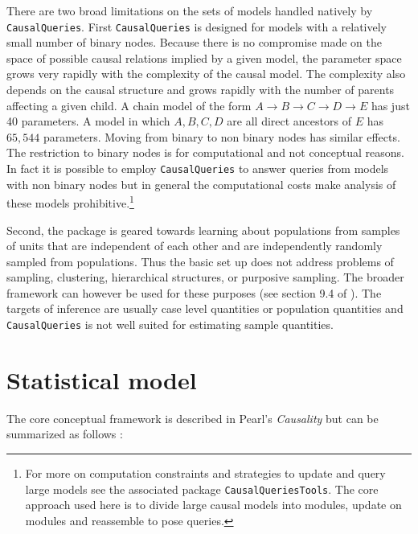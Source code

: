 \documentclass[
  11pt,
  article]{jss}
\begin{document}
There are two broad limitations on the sets of models handled natively
by \texttt{CausalQueries}. First \texttt{CausalQueries} is designed for
models with a relatively small number of binary nodes. Because there is
no compromise made on the space of possible causal relations implied by
a given model, the parameter space grows very rapidly with the
complexity of the causal model. The complexity also depends on the
causal structure and grows rapidly with the number of parents affecting
a given child. A chain model of the form
\(A \rightarrow B \rightarrow C \rightarrow D \rightarrow E\) has just
40 parameters. A model in which \(A, B, C, D\) are all direct ancestors
of \(E\) has \(65,544\) parameters. Moving from binary to non binary
nodes has similar effects. The restriction to binary nodes is for
computational and not conceptual reasons. In fact it is possible to
employ \texttt{CausalQueries} to answer queries from models with non
binary nodes but in general the computational costs make analysis of
these models prohibitive.\footnote{For more on computation constraints
  and strategies to update and query large models see the associated
  package \texttt{CausalQueriesTools}. The core approach used here is to
  divide large causal models into modules, update on modules and
  reassemble to pose queries.}

Second, the package is geared towards learning about populations from
samples of units that are independent of each other and are
independently randomly sampled from populations. Thus the basic set up
does not address problems of sampling, clustering, hierarchical
structures, or purposive sampling. The broader framework can however be
used for these purposes (see section 9.4 of
\citet{humphreys_integrated_2023}). The targets of inference are usually
case level quantities or population quantities and
\texttt{CausalQueries} is not well suited for estimating sample
quantities.

\hypertarget{sec-theory}{%
\section{Statistical model}\label{sec-theory}}

The core conceptual framework is described in Pearl's \emph{Causality}
\citep{pearl_causality_2009} but can be summarized as follows
\citep[using the notation proposed in][]{humphreys_integrated_2023}:
\end{document}
